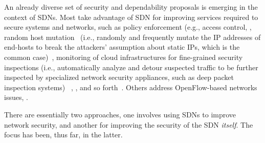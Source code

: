 An already diverse set of security and dependability proposals is emerging in the context of SDNs.
Most take advantage 
of SDN for improving services required to secure systems and networks, such as policy enforcement (e.g., access 
control, , random host mutation~\cite{stabler2012} (i.e., randomly and frequently mutate the IP addresses of end-hosts to break the attackers' assumption about static IPs, which is the common case)~\cite{jafarian2012}, monitoring of cloud infrastructures for fine-grained security inspections (i.e., automatically analyze and detour suspected traffic to be  further inspected by specialized network security appliances, such as deep packet inspection systems) ~\cite{shin2012}, ,  and so forth~\cite{casado2006,wang2012-1,braga2010-1,jafarian2012,shin2012,stabler2012,yao2011,mehdi2011}.
Others address OpenFlow-based networks issues, .

There are essentially two approaches, one involves using SDNs to improve network security, and another for improving the 
security of the SDN \emph{itself}. 
The focus has been, thus far, in the latter.

%

